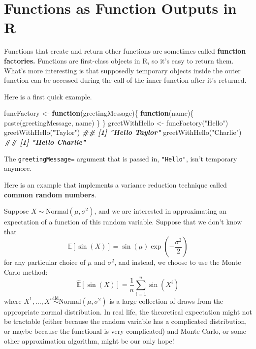 \documentclass[
  12pt,
  krantz2]{krantz}
\makeatletter
\newenvironment{Shaded}{\begin{snugshade}}{\end{snugshade}}
\newcommand{\ControlFlowTok}[1]{\textcolor[rgb]{0.27,0.27,0.27}{\textbf{#1}}}
\newcommand{\DocumentationTok}[1]{\textcolor[rgb]{0.37,0.37,0.37}{\textbf{\textit{#1}}}}
\newcommand{\FunctionTok}[1]{\textcolor[rgb]{0,0,0}{#1}}
\newcommand{\NormalTok}[1]{#1}
\newcommand{\OtherTok}[1]{\textcolor[rgb]{0.37,0.37,0.37}{#1}}
\newcommand{\StringTok}[1]{\textcolor[rgb]{0.5,0.5,0.5}{#1}}
\newenvironment{kframe}{%
\medskip{}
\setlength{\fboxsep}{.8em}
 \def\at@end@of@kframe{}%
 \ifinner\ifhmode%
  \def\at@end@of@kframe{\end{minipage}}%
  \begin{minipage}{\columnwidth}%
 \fi\fi%
 \def\FrameCommand##1{\hskip\@totalleftmargin \hskip-\fboxsep
 \colorbox{shadecolor}{##1}\hskip-\fboxsep
     \hskip-\linewidth \hskip-\@totalleftmargin \hskip\columnwidth}%
 \MakeFramed {\advance\hsize-\width
   \@totalleftmargin\z@ \linewidth\hsize
   \@setminipage}}%
 {\par\unskip\endMakeFramed%
 \at@end@of@kframe}
\renewenvironment{Shaded}{\begin{kframe}}{\end{kframe}}
\makeatother
\begin{document}
\hypertarget{functions-as-function-outputs-in-r}{%
\section{Functions as Function Outputs in R}\label{functions-as-function-outputs-in-r}}

Functions that create and return other functions are sometimes called \textbf{function factories.} Functions are first-class objects in R, so it's easy to return them. What's more interesting is that supposedly temporary objects inside the outer function can be accessed during the call of the inner function after it's returned.

Here is a first quick example.

\begin{Shaded}
\begin{Highlighting}[]
\NormalTok{funcFactory }\OtherTok{\textless{}{-}} \ControlFlowTok{function}\NormalTok{(greetingMessage)\{}
  \ControlFlowTok{function}\NormalTok{(name)\{}
    \FunctionTok{paste}\NormalTok{(greetingMessage, name)}
\NormalTok{  \}}
\NormalTok{\}}
\NormalTok{greetWithHello }\OtherTok{\textless{}{-}} \FunctionTok{funcFactory}\NormalTok{(}\StringTok{"Hello"}\NormalTok{)}
\FunctionTok{greetWithHello}\NormalTok{(}\StringTok{"Taylor"}\NormalTok{)}
\DocumentationTok{\#\# [1] "Hello Taylor"}
\FunctionTok{greetWithHello}\NormalTok{(}\StringTok{"Charlie"}\NormalTok{)}
\DocumentationTok{\#\# [1] "Hello Charlie"}
\end{Highlighting}
\end{Shaded}

The \texttt{greetingMessage=} argument that is passed in, \texttt{"Hello"}, isn't temporary anymore.

Here is an example that implements a variance reduction technique called \textbf{common random numbers}.

Suppose \(X \sim \text{Normal}(\mu, \sigma^2)\), and we are interested in approximating an expectation of a function of this random variable. Suppose that we don't know that
\[
\mathbb{E}[\sin(X)] = \sin(\mu) \exp\left(-\frac{\sigma^2}{2}\right)
\]
for any particular choice of \(\mu\) and \(\sigma^2\), and instead, we choose to use the Monte Carlo method:
\[
\hat{\mathbb{E}}[\sin(X)] = \frac{1}{n}\sum_{i=1}^n\sin(X^i)
\]
where \(X^1, \ldots, X^n \overset{\text{iid}}{\sim} \text{Normal}(\mu, \sigma^2)\) is a large collection of draws from the appropriate normal distribution. In real life, the theoretical expectation might not be tractable (either because the random variable has a complicated distribution, or maybe because the functional is very complicated) and Monte Carlo, or some other approximation algorithm, might be our only hope!
\end{document}
